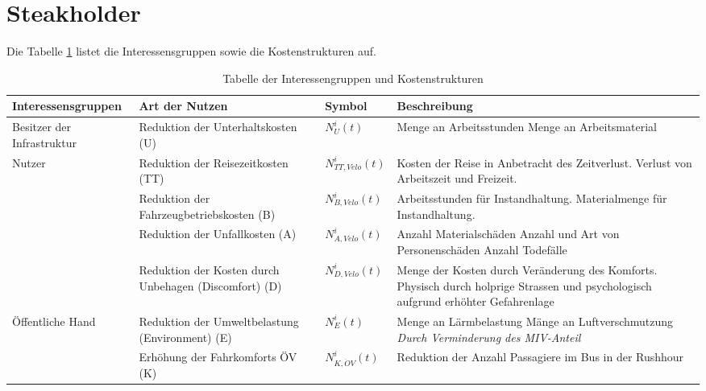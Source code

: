 \newpage

\section{\textbf{{Steakholder}}}

Die Tabelle \ref{table:1} listet die Interessensgruppen sowie die Kostenstrukturen auf. \\ [2ex]


\begin{table}[htbp]
\centering
\begin{tabular}{ |p{3cm} p{4cm} p{2cm} p{3cm}|  }
 \hline
 Interessensgruppen & Art der Nutzen & Symbol & Beschreibung\\ [0.5ex]
 \hline
 
Besitzer der Infrastruktur 
& Reduktion der \newline Unterhaltskosten (U)  & $N_{U}^i(t)$ & Menge an Arbeitsstunden \newline Menge an Arbeitsmaterial\\
\hline
    
Nutzer 
& Reduktion der Reisezeitkosten (TT) & $N_{TT,Velo}^i(t)$ & Kosten     der Reise in Anbetracht      des  Zeitverlust. \newline 
Verlust von Arbeitszeit und Freizeit. \\ 
    
& Reduktion der Fahrzeugbetriebskosten (B) & $N_{B,Velo}^i(t)$ & Arbeitsstunden für Instandhaltung. \newline 
Materialmenge für Instandhaltung.\\ 

& Reduktion der Unfallkosten (A) & $N_{A,Velo}^i(t)$ & Anzahl Materialschäden \newline Anzahl und Art von Personenschäden \newline Anzahl Todefälle \\

& Reduktion der Kosten durch Unbehagen \newline (Discomfort) (D) & $N_{D,Velo}^i(t)$ & Menge der Kosten durch Veränderung des Komforts. \newline Physisch durch holprige Strassen und 
psychologisch aufgrund erhöhter Gefahrenlage \\
\hline

Öffentliche Hand
& Reduktion der Umweltbelastung \newline (Environment) (E)  & $N_E^i(t)$ & Menge an Lärmbelastung \newline Mänge an Luftverschmutzung \newline \textit{Durch Verminderung des MIV-Anteil} \\

& Erhöhung der Fahrkomforts ÖV (K) & $N_{K,\ddot{O}V}^i(t)$ & Reduktion der Anzahl Passagiere im Bus in der Rushhour \\
\hline

\end{tabular}
\caption{Tabelle der Interessengruppen und Kostenstrukturen}
\label{table:1}
\end{table}


